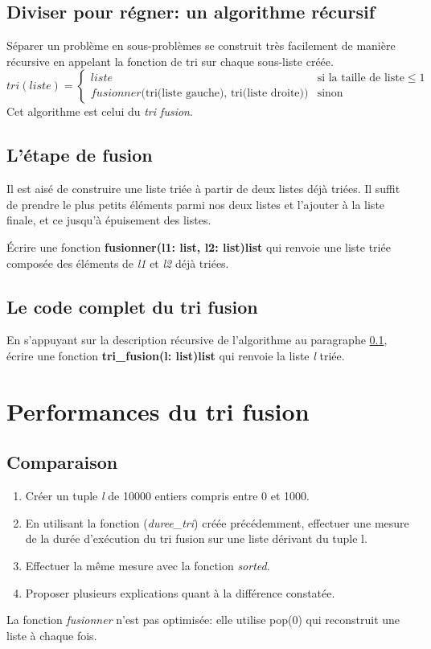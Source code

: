 \documentclass[a4paper,11pt]{article}
\begin{document}
\begin{Form}
\subsection{Diviser pour régner: un algorithme récursif}\label{algo}
Séparer un problème en sous-problèmes se construit très facilement de manière récursive en appelant la fonction de tri sur chaque sous-liste créée.
$$
tri(liste) = \left\{
    \begin{array}{ll}
        liste & \mbox{si la taille de liste} \leq 1 \\
        fusionner(\mbox{tri(liste gauche), tri(liste droite))} & \mbox{sinon }
    \end{array}
\right.
$$
Cet algorithme est celui du \emph{tri fusion}.
\subsection{L'étape de fusion}
Il est aisé de construire une liste triée à partir de deux listes déjà triées. Il suffit de prendre le plus petits éléments parmi nos deux listes et l'ajouter à la liste finale, et ce jusqu'à épuisement des listes.
\begin{activite}
Écrire une fonction \textbf{fusionner(l1: list, l2: list)\;\rightarrow\;list} qui renvoie une liste triée composée des éléments de \emph{l1} et \emph{l2} déjà triées.
\end{activite}
\subsection{Le code complet du tri fusion}
\begin{activite}
En s'appuyant sur la description récursive de l'algorithme au paragraphe \ref{algo}, écrire une fonction \textbf{tri\_fusion(l: list)\;\rightarrow\;list} qui renvoie la liste \emph{l} triée.
\end{activite}
\section{Performances du tri fusion}
\subsection{Comparaison}
\begin{activite}
\begin{enumerate}
\item Créer un tuple \emph{l} de 10000 entiers compris entre 0 et 1000.
\item En utilisant la fonction (\emph{duree\_tri}) créée précédemment, effectuer une mesure de la durée d'exécution du tri fusion sur une liste dérivant du tuple l.
\item Effectuer la même mesure avec la fonction \emph{sorted}.
\item Proposer plusieurs explications quant à la différence constatée.
\end{enumerate}
\end{activite}
\begin{commentprof}
La fonction \emph{fusionner} n'est pas optimisée: elle utilise pop(0) qui reconstruit une liste à chaque fois.
\end{commentprof}

\end{Form}
\end{document}

